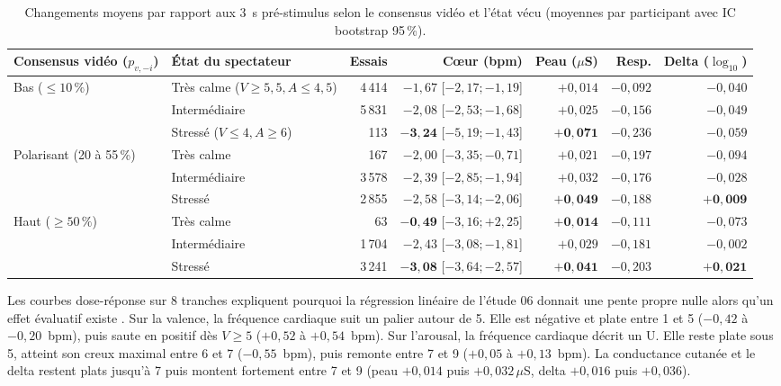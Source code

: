 \documentclass[10pt]{article}
\begin{document}
\begin{table}[t]
\centering\footnotesize
\setlength{\tabcolsep}{4.5pt}
\begin{tabular}{@{}llrrrrr@{}}
\toprule
Consensus vidéo ($p_{v,-i}$) & État du spectateur & Essais & Cœur (bpm) & Peau ($\mu$S) & Resp. & Delta ($\log_{10}$)\\
\midrule
Bas ($\le 10\,\%$) & Très calme ($V\ge 5{,}5, A\le 4{,}5$) & 4\,414 & $-1{,}67$ [$-2{,}17 ; -1{,}19$] & $+0{,}014$ & $-0{,}092$ & $-0{,}040$\\
 & Intermédiaire & 5\,831 & $-2{,}08$ [$-2{,}53 ; -1{,}68$] & $+0{,}025$ & $-0{,}156$ & $-0{,}049$\\
 & Stressé ($V\le 4, A\ge 6$) & 113 & $\mathbf{-3{,}24}$ [$-5{,}19 ; -1{,}43$] & $\mathbf{+0{,}071}$ & $-0{,}236$ & $-0{,}059$\\
\midrule
Polarisant (20 à 55\,\%) & Très calme & 167 & $-2{,}00$ [$-3{,}35 ; -0{,}71$] & $+0{,}021$ & $-0{,}197$ & $-0{,}094$\\
 & Intermédiaire & 3\,578 & $-2{,}39$ [$-2{,}85 ; -1{,}94$] & $+0{,}032$ & $-0{,}176$ & $-0{,}028$\\
 & Stressé & 2\,855 & $-2{,}58$ [$-3{,}14 ; -2{,}06$] & $\mathbf{+0{,}049}$ & $-0{,}188$ & $\mathbf{+0{,}009}$\\
\midrule
Haut ($\ge 50\,\%$) & Très calme & 63 & $\mathbf{-0{,}49}$ [$-3{,}16 ; +2{,}25$] & $\mathbf{+0{,}014}$ & $-0{,}111$ & $-0{,}073$\\
 & Intermédiaire & 1\,704 & $-2{,}43$ [$-3{,}08 ; -1{,}81$] & $+0{,}029$ & $-0{,}181$ & $-0{,}002$\\
 & Stressé & 3\,241 & $\mathbf{-3{,}08}$ [$-3{,}64 ; -2{,}57$] & $\mathbf{+0{,}041}$ & $-0{,}203$ & $\mathbf{+0{,}021}$\\
\bottomrule
\end{tabular}
\caption{Changements moyens par rapport aux 3~s pré-stimulus selon le consensus vidéo et l'état vécu (moyennes par participant avec IC bootstrap 95\,\%).}
\label{tab:matrix2x2}
\end{table}

Les courbes dose-réponse sur 8 tranches expliquent pourquoi la régression linéaire de l'étude 06 donnait une pente propre nulle alors qu'un effet évaluatif existe \cite{mauss2005,golland2014}. Sur la valence, la fréquence cardiaque suit un palier autour de 5. Elle est négative et plate entre 1 et 5 ($-0{,}42$ à $-0{,}20$~bpm), puis saute en positif dès $V \ge 5$ ($+0{,}52$ à $+0{,}54$~bpm). Sur l'arousal, la fréquence cardiaque décrit un U. Elle reste plate sous 5, atteint son creux maximal entre 6 et 7 ($-0{,}55$~bpm), puis remonte entre 7 et 9 ($+0{,}05$ à $+0{,}13$~bpm). La conductance cutanée et le delta restent plats jusqu'à 7 puis montent fortement entre 7 et 9 (peau $+0{,}014$ puis $+0{,}032\,\mu$S, delta $+0{,}016$ puis $+0{,}036$).
\end{document}
